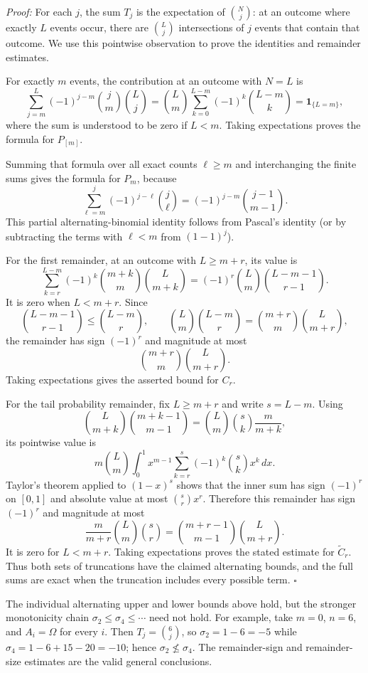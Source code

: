 \documentclass[a4paper,11pt,abstracton]{scrartcl}
\theoremstyle{dotlessP}
\theoremstyle{dotlessS}
\theoremstyle{remark}
\theoremstyle{definition}
\begin{document}
\begin{claim_box}
\textit{Proof:} For each $j$, the sum $T_j$ is the expectation of $\binom{N}{j}$: at an outcome where exactly $L$ events occur, there are $\binom{L}{j}$ intersections of $j$ events that contain that outcome. We use this pointwise observation to prove the identities and remainder estimates.

For exactly $m$ events, the contribution at an outcome with $N=L$ is
\[
  \sum_{j=m}^{L}(-1)^{j-m}\binom{j}{m}\binom{L}{j}
  =\binom{L}{m}\sum_{k=0}^{L-m}(-1)^k\binom{L-m}{k}
  =\mathbf{1}_{\{L=m\}},
\]
where the sum is understood to be zero if $L<m$. Taking expectations proves the formula for $P_{[m]}$.

Summing that formula over all exact counts $\ell\geq m$ and interchanging the finite sums gives the formula for $P_m$, because
\[
  \sum_{\ell=m}^{j}(-1)^{j-\ell}\binom{j}{\ell}
  =(-1)^{j-m}\binom{j-1}{m-1}.
\]
This partial alternating-binomial identity follows from Pascal's identity (or by subtracting the terms with $\ell<m$ from $(1-1)^j$).

For the first remainder, at an outcome with $L\geq m+r$, its value is
\[
  \sum_{k=r}^{L-m}(-1)^k\binom{m+k}{m}\binom{L}{m+k}
  =(-1)^r\binom{L}{m}\binom{L-m-1}{r-1}.
\]
It is zero when $L<m+r$. Since
\[
  \binom{L-m-1}{r-1}\leq\binom{L-m}{r},\qquad
  \binom{L}{m}\binom{L-m}{r}
  =\binom{m+r}{m}\binom{L}{m+r},
\]
the remainder has sign $(-1)^r$ and magnitude at most
\[\binom{m+r}{m}\binom{L}{m+r}.\]
Taking expectations gives the asserted bound for $C_r$.

For the tail probability remainder, fix $L\geq m+r$ and write $s=L-m$. Using
\[
  \binom{L}{m+k}\binom{m+k-1}{m-1}
  =\binom{L}{m}\binom{s}{k}\frac{m}{m+k},
\]
its pointwise value is
\[
  m\binom{L}{m}\int_0^1 x^{m-1}
  \sum_{k=r}^{s}(-1)^k\binom{s}{k}x^k\,dx.
\]
Taylor's theorem applied to $(1-x)^s$ shows that the inner sum has sign $(-1)^r$ on $[0,1]$ and absolute value at most $\binom{s}{r}x^r$. Therefore this remainder has sign $(-1)^r$ and magnitude at most
\[
  \frac{m}{m+r}\binom{L}{m}\binom{s}{r}
  =\binom{m+r-1}{m-1}\binom{L}{m+r}.
\]
It is zero for $L<m+r$. Taking expectations proves the stated estimate for $\widetilde{C}_r$. Thus both sets of truncations have the claimed alternating bounds, and the full sums are exact when the truncation includes every possible term.
\hfill$\square$
\end{claim_box}

\begin{remark_box}
The individual alternating upper and lower bounds above hold, but the stronger monotonicity chain $\sigma_2\leq\sigma_4\leq\cdots$ need not hold. For example, take $m=0$, $n=6$, and $A_i=\Omega$ for every $i$. Then $T_j=\binom{6}{j}$, so $\sigma_2=1-6=-5$ while $\sigma_4=1-6+15-20=-10$; hence $\sigma_2\nleq\sigma_4$. The remainder-sign and remainder-size estimates are the valid general conclusions.
\end{remark_box}
\end{document}
